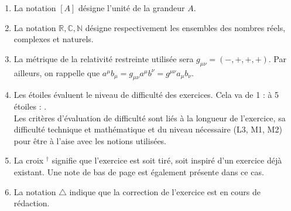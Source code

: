\documentclass[a4paper,10pt]{report}
\begin{document}
\begin{enumerate}
		\item La notation $[A]$ désigne l'unité de la grandeur $A$.
		\item La notation $\mathbb{R}, \mathbb{C}, \mathbb{N}$ désigne respectivement les ensembles des nombres réels, complexes et naturels.
		\item La métrique de la relativité restreinte utilisée sera $g_{\mu\nu} = (-,+,+,+)$. Par ailleurs, on rappelle que $a^\mu b_\mu = g_{\mu \nu} a^\mu b^\nu = g^{\mu \nu} a_\mu b_\nu$.
		\item Les étoiles évaluent le niveau de difficulté des exercices. Cela va de 1 : \faStar \space à 5 étoiles :  \faStar\faStar\faStar\faStar\faStar.
		\\ Les critères d'évaluation de difficulté sont liés à la longueur de l'exercice, sa difficulté technique et mathématique et du niveau nécessaire (L3, M1, M2) pour être à l'aise avec les notions utilisées.
		\item La croix $^\dag$ signifie que l'exercice est soit tiré, soit inspiré d'un exercice déjà existant. Une note de bas de page est également présente dans ce cas.
		\item La notation $\triangle$ indique que la correction de l'exercice est en cours de rédaction.
	\end{enumerate}
	
\end{document}
